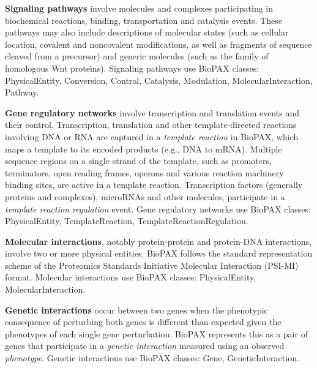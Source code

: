 \begin{frame}
\textbf{Signaling pathways} involve molecules and complexes participating in biochemical reactions, binding, transportation and catalysis events. These pathways may also include descriptions of molecular states (such as cellular location, covalent and noncovalent modifications, as well as fragments of sequence cleaved from a precursor) and generic molecules (such as the family of homologous Wnt proteins). Signaling pathways use BioPAX classes: PhysicalEntity, Conversion, Control, Catalysis, Modulation, MolecularInteraction, Pathway. 
\end{frame}

\begin{frame}
\textbf{Gene regulatory networks} involve transcription and translation
events and their control. Transcription, translation and other template-directed reactions involving DNA or RNA are captured in a {\it template reaction} in BioPAX, which maps a template to its encoded products (e.g., DNA to mRNA). Multiple sequence regions on a single strand of the template, such as promoters, terminators, open reading frames, operons and various reaction machinery binding sites, are active in a template reaction. Transcription factors (generally proteins and complexes), microRNAs and other molecules, participate in a {\it template reaction regulation} event. Gene regulatory networks use BioPAX classes: PhysicalEntity, TemplateReaction, TemplateReactionRegulation. 
\end{frame}

\begin{frame}
\textbf{Molecular interactions}, notably protein-protein and
protein-DNA interactions, involve two or more physical entities. BioPAX follows the standard representation scheme of the Proteomics Standards Initiative Molecular Interaction (PSI-MI) format. Molecular interactions use BioPAX classes: PhysicalEntity, MolecularInteraction.
\end{frame}

\begin{frame}
\textbf{Genetic interactions} occur between two genes when the phenotypic consequence of perturbing both genes is different than expected given the phenotypes of each single gene perturbation. BioPAX represents this as a pair of genes that participate in a {\it genetic interaction} measured using an observed {\it phenotype}. Genetic interactions use BioPAX classes: Gene, GeneticInteraction.
\end{frame}

